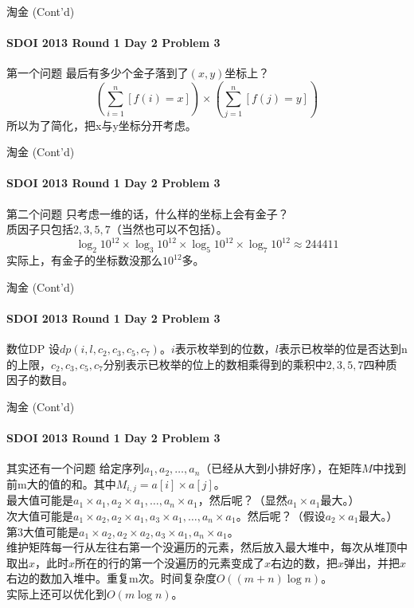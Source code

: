 \documentclass[hyperref={unicode=true}]{beamer}
\theoremstyle{definition}
\theoremstyle{proof}
\begin{document}
\begin{frame}{淘金 (Cont'd)}\framesubtitle{SDOI 2013 Round 1 Day 2 Problem 3}
  \begin{alertblock}{第一个问题}
    最后有多少个金子落到了$(x,y)$坐标上？\\
    \pause{}\[(\sum_{i=1}^n[f(i)=x])\times(\sum_{j=1}^n[f(j)=y])\]
    所以为了简化，把x与y坐标分开考虑。
  \end{alertblock}
\end{frame}

\begin{frame}{淘金 (Cont'd)}\framesubtitle{SDOI 2013 Round 1 Day 2 Problem 3}
  \begin{alertblock}{第二个问题}
    只考虑一维的话，什么样的坐标上会有金子？\\
    \pause{}质因子只包括$2,3,5,7$（当然也可以不包括）。\\
    \[\log_2{10^{12}} \times \log_3{10^{12}} \times \log_5{10^{12}} \times \log_7{10^{12}} \approx 244411 \]
    实际上，有金子的坐标数没那么$10^{12}$多。
  \end{alertblock}
\end{frame}

\begin{frame}{淘金 (Cont'd)}\framesubtitle{SDOI 2013 Round 1 Day 2 Problem 3}
  \begin{exampleblock}{数位DP}
    设$dp(i,l,c_2,c_3,c_5,c_7)$。$i$表示枚举到的位数，$l$表示已枚举的位是否达到n的上限，$c_2,c_3,c_5,c_7$分别表示已枚举的位上的数相乘得到的乘积中$2,3,5,7$四种质因子的数目。
  \end{exampleblock}
\end{frame}

\begin{frame}{淘金 (Cont'd)}\framesubtitle{SDOI 2013 Round 1 Day 2 Problem 3}
  \begin{exampleblock}{其实还有一个问题}
    给定序列$a_1,a_2,\ldots ,a_n$（已经从大到小排好序），在矩阵$M$中找到前m大的值的和。其中$M_{i,j}=a[i]\times a[j]$。\\
    \pause{}最大值可能是$a_1\times a_1,a_2 \times a_1, \ldots, a_n \times a_1$，然后呢？（显然$a_1 \times a_1$最大。）\\
    次大值可能是$a_1 \times a_2,a_2\times a_1, a_3 \times a_1,\ldots,a_n \times a_1$。然后呢？（假设$a_2 \times a_1$最大。）\\
    第3大值可能是$a_1 \times a_2, a_2 \times a_2, a_3 \times a_1, a_n \times a_1$。\\
    维护矩阵每一行从左往右第一个没遍历的元素，然后放入最大堆中，每次从堆顶中取出$x$，此时$x$所在的行的第一个没遍历的元素变成了$x$右边的数，把$x$弹出，并把$x$右边的数加入堆中。重复m次。时间复杂度$O((m+n) \log{n})$。\\
    实际上还可以优化到$O(m \log{n})$。
  \end{exampleblock}
\end{frame}
\end{document}
